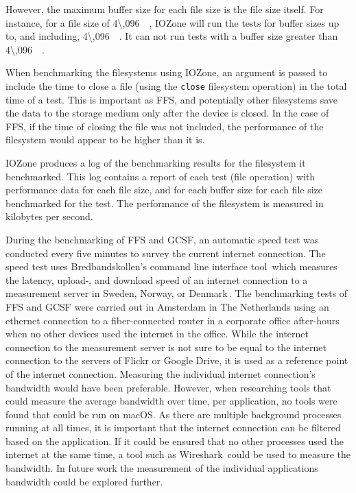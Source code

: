 However, the maximum buffer size for each file size is the file size itself. For instance, for a file size of \SI{4\,096}{\kilo\byte}, IOZone will run the tests for buffer sizes up to, and including, \SI{4\,096}{\kilo\byte}. It can not run tests with a buffer size greater than \SI{4\,096}{\kilo\byte}.

When benchmarking the filesystems using IOZone, an argument is passed to include the time to close a file (using the \texttt{close} filesystem operation) in the total time of a test. This is important as \gls{FFS}, and potentially other filesystems save the data to the storage medium only after the device is closed. In the case of \gls{FFS}, if the time of closing the file was not included, the performance of the filesystem would appear to be higher than it is.

IOZone produces a log of the benchmarking results for the filesystem it benchmarked. This log contains a report of each test (file operation) with performance data for each file size, and for each buffer size for each file size benchmarked for the test. The performance of the filesystem is measured in kilobytes per second.

During the benchmarking of \gls{FFS} and \gls{GCSF}, an automatic speed test was conducted every five minutes to survey the current internet connection. The speed test uses Bredbandskollen's command line interface tool\,\cite{internetstiftelsenBredbandskollenCLIBredbandskollen} which measures the latency, upload-, and download speed of an internet connection to a measurement server in Sweden, Norway, or Denmark\,\cite{internetstiftelsenMerOmBredbandskollen}. The benchmarking tests of \gls{FFS} and \gls{GCSF} were carried out in Amsterdam in The Netherlands using an ethernet connection to a \mbox{fiber-connected} router in a corporate office after-hours when no other devices used the internet in the office. While the internet connection to the measurement server is not sure to be equal to the internet connection to the servers of Flickr or Google Drive, it is used as a reference point of the internet connection. Measuring the individual internet connection's bandwidth would have been preferable. However, when researching tools that could measure the average bandwidth over time, per application, no tools were found that could be run on macOS. As there are multiple background processes running at all times, it is important that the internet connection can be filtered based on the application. If it could be ensured that no other processes used the internet at the same time, a tool such as Wireshark\,\cite{WiresharkGoDeep} could be used to measure the bandwidth. In future work the measurement of the individual applications bandwidth could be explored further. 